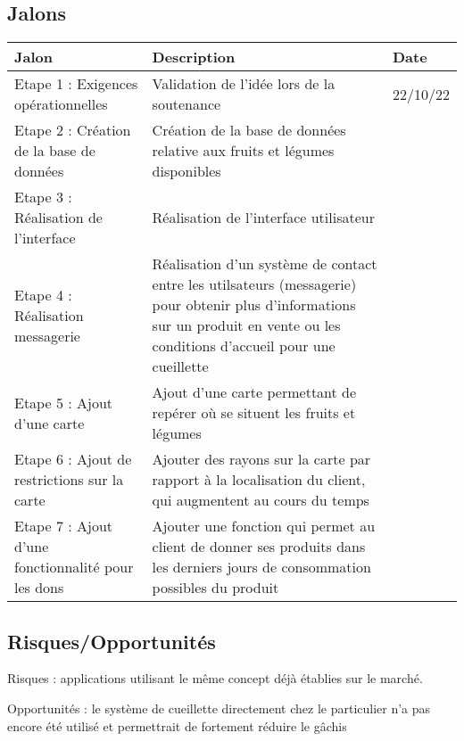 \documentclass{article}
\begin{document}
\subsection{Jalons}
\begin{center}
\begin{tabular}{|p{3cm}|p{5cm}|p{2cm}|} 
  \hline
  Jalon & Description & Date \\
  \hline
  Etape 1 : Exigences opérationnelles & Validation de l'idée lors de la soutenance & 22/10/22 \\
  \hline
  Etape 2 : Création de la base de données & Création de la base de données relative aux fruits et légumes disponibles &  \\
  \hline
  Etape 3 : Réalisation de l'interface & Réalisation de l'interface utilisateur & \\
  \hline
  Etape 4 : Réalisation messagerie & 
  Réalisation d'un système de contact entre les utilsateurs (messagerie) pour obtenir plus d'informations sur un produit en vente ou les conditions d'accueil pour une cueillette & \\
  \hline
  Etape 5 : Ajout d'une carte & Ajout d'une carte permettant de repérer où se situent les fruits et légumes & \\
  \hline
  Etape 6 : Ajout de restrictions sur la carte & Ajouter des rayons sur la carte par rapport à la localisation du client, qui augmentent au cours du temps & \\
  \hline
  Etape 7 : Ajout d'une fonctionnalité pour les dons & Ajouter une fonction qui permet au client de donner ses produits dans les derniers jours de consommation possibles du produit & \\ 
  \hline
\end{tabular}
\end{center}


\subsection{Risques/Opportunités}

Risques : applications utilisant le même concept déjà établies sur le marché.


Opportunités : le système de cueillette directement chez le particulier n'a pas encore été utilisé et permettrait de fortement réduire le gâchis
\end{document}
